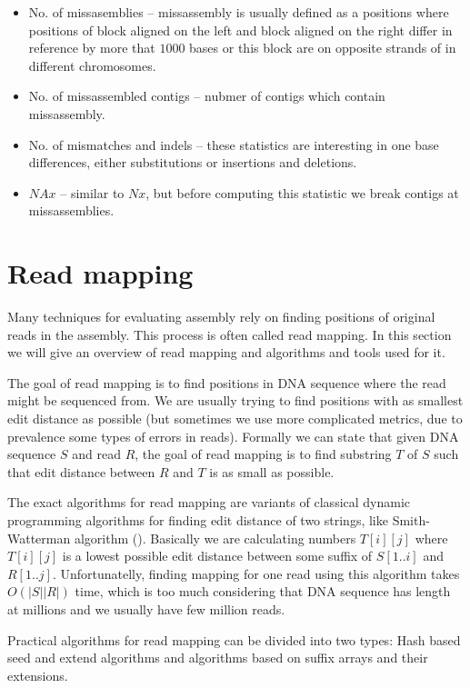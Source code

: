 \begin{itemize}
\item No. of missasemblies -- missassembly is usually defined as a positions where
positions of block aligned on the left and block aligned on the right differ in reference
by more that $1000$ bases or this block are on opposite strands of in different chromosomes.
\item No. of missassembled contigs -- nubmer of contigs which contain missassembly.
\item No. of mismatches and indels -- these statistics are interesting in one base differences,
either substitutions or insertions and deletions.
\item $NAx$ -- similar to $Nx$, but before computing this statistic we break
contigs at missassemblies.
\end{itemize}

\section{Read mapping}

Many techniques for evaluating assembly rely on finding
positions of original reads in the assembly. This process is often called read mapping.
In this section we will give an overview of read mapping and algorithms and tools used for it.

The goal of read mapping is to find positions in DNA sequence where the read might be sequenced
from. We are usually trying to find positions with as smallest edit distance as possible
(but sometimes we use more complicated metrics, due to prevalence some types of errors in reads).
Formally we can state that given DNA sequence $S$ and read $R$, the goal of read mapping
is to find substring $T$ of $S$ such that edit distance between $R$ and $T$ is as small as possible.

The exact algorithms for read mapping are variants of classical dynamic programming algorithms
for finding edit distance of two strings, like Smith-Watterman algorithm (\cite{sm}).
Basically we are calculating numbers $T[i][j]$ where $T[i][j]$ is a lowest possible edit
distance between some suffix of $S[1..i]$ and $R[1..j]$. 
Unfortunatelly, finding mapping for one read using this algorithm takes $O(|S||R|)$ time,
which is too much considering that DNA sequence has length at millions and we usually have
few million reads.

Practical algorithms for read mapping can be divided into two types:
Hash based seed and extend algorithms and algorithms based on suffix arrays and their extensions.

